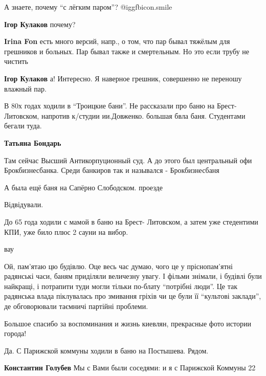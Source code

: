 \begin{itemize}
А знаете, почему \enquote{с лёгким паром}?  @igg{fbicon.smile} 

\begin{itemize} %
\textbf{Ігор Кулаков} почему?

\textbf{Irina Fon} есть много версий, напр., о том, что пар бывал тяжёлым для грешников и больных. Пар бывал также и смертельным. Но это если трубу не чистить

\textbf{Ігор Кулаков} а! Интересно. Я наверное грешник, совершенно не переношу влажный пар.
\end{itemize} %


В 80х годах ходили в \enquote{Троицкие бани}. Не рассказали про баню на
Брест-Литовском, напротив к/студии ии.Довженко. большая бвла баня. Студентами
бегали туда.

\textbf{Татьяна Бондарь} 

Там сейчас Высший Антикорпуционный суд. А до этого был центральный офи
Брокбизнесбанка. Среди банкиров так и назывался - Брокбизнесбаня

А была ещё баня на Сапёрно Слободском. проезде

Відвідували.


До 65 года ходили с мамой в баню на Брест- Литовском, а затем уже стедентими
КПИ, уже било плюс 2 сауни на вибор.


вау


Ой, пам'ятаю цю будівлю. Оце весь час думаю, чого це у пріснопам'ятні радянські
часи, баням приділяли величезну увагу. І фільми знімали, і будівлі були
найкращі, і потрапити туди могли тільки по-блату \enquote{потрібні люди}. Це так
радянська влада піклувалась про змивання гріхів чи це були її \enquote{культові
заклади}, де обговорювали таємничі партійні проблеми.


Большое спасибо за воспоминания и жизнь киевлян, прекрасные фото истории города!

Да. С Парижской коммуны ходили в баню на Постышева. Рядом.

\begin{itemize} %
\textbf{Константин Голубев} Мы с Вами были соседями: и я с Парижской Коммуны 22
\end{itemize} %


\end{itemize}
